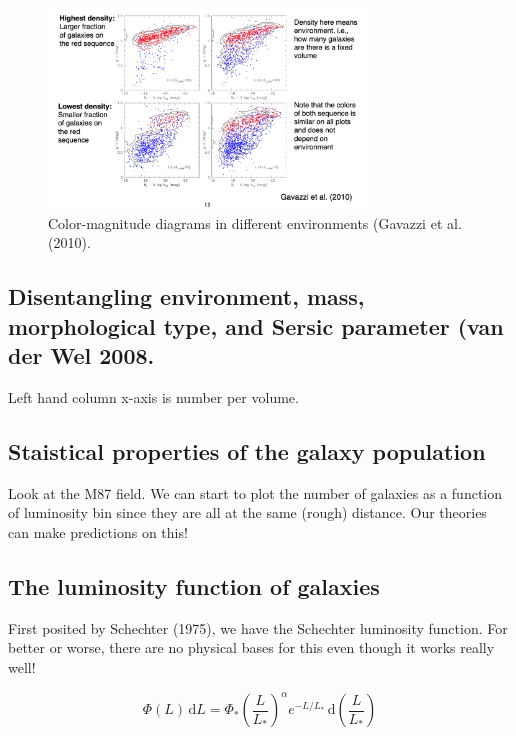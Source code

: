 \documentclass{article}
\begin{document}
\begin{figure}
    \centering
    \includegraphics[width=0.75\textwidth]{figs/Screen Shot 2021-09-03 at 11.30.48 AM.png}
    \caption{Color-magnitude diagrams in different environments (Gavazzi et al. (2010).  }
    \label{fig:cmd_env}
\end{figure}

\subsection{Disentangling environment, mass, morphological type, and Sersic parameter (van der Wel 2008. }

Left hand column x-axis is number per volume. 

\subsection{Staistical properties of the galaxy population}

Look at the M87 field. We can start to plot the number of galaxies as a function of luminosity bin since they are all at the same (rough) distance. Our theories can make predictions on this!

\subsection{The luminosity function of galaxies}

First posited by Schechter (1975), we have the Schechter luminosity function. For better or worse, there are no physical bases for this even though it works really well!

\begin{equation}
    \Phi(L) \,\mathrm{d}L = \Phi_* \left(\frac{L}{L_*}\right)^{\alpha} e^{-L/L_*} \, \mathrm{d}\left(\frac{L}{L_*}\right)
\end{equation}
\end{document}

